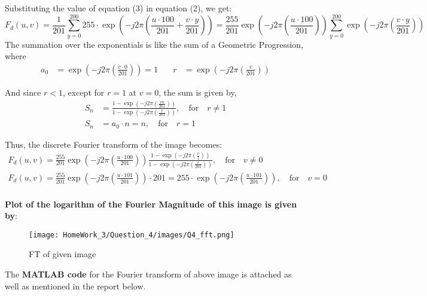 \documentclass{article}
\begin{document}
\begin{enumerate}
Substituting the value of equation (3) in equation (2), we get:
\begin{equation}
    F_d(u, v) = \frac{1}{201} \sum_{y=0}^{200} 255 \cdot \exp \left(- j 2 \pi \left( \frac{u\cdot 100}{201} + \frac{v\cdot y}{201} \right) \right) = \frac{255}{201} \exp \left(- j 2 \pi \left( \frac{u\cdot100}{201}\right) \right) \sum_{y=0}^{200} \exp \left(- j 2 \pi \left( \frac{v\cdot y}{201} \right) \right)
\end{equation}
The summation over the exponentials is like the sum of a Geometric Progression, where 
\begin{equation}
\begin{aligned}
    a_0 &= \exp\left( -j2\pi \left( \frac{v \cdot 0}{201} \right) \right) = 1 \quad & r &= \exp\left( -j2\pi \left( \frac{v}{201} \right) \right)
\end{aligned}
\end{equation}

And since \(r < 1\), except for \(r = 1\) at \(v = 0\), the sum is given by,
\begin{equation}
\begin{aligned}
S_n &= \frac{1 - \exp\left( -j2\pi \left( \frac{vn}{201} \right) \right)}{1 - \exp\left( -j2\pi \left( \frac{v}{201} \right) \right)}, \quad \text{for} \quad r \neq 1 \\
S_n &= a_0 \cdot n = n, \quad \text{for} \quad r = 1
\end{aligned}
\end{equation}

Thus, the discrete Fourier transform of the image becomes:
\begin{equation}
\begin{aligned}
    F_d(u, v) = \frac{255}{201} \exp \left(- j 2 \pi \left( \frac{u\cdot100}{201}\right) \right) \frac{1 - \exp\left( -j2\pi \left( \frac{v}{1} \right) \right)}{1 - \exp\left( -j2\pi \left( \frac{v}{201} \right) \right)}, \quad \text{for} \quad v \neq 0 \\
    F_d(u, v) = \frac{255}{201} \exp \left(- j 2 \pi \left( \frac{u\cdot101}{201}\right) \right) \cdot 201 = 255 \cdot \exp \left(- j 2 \pi \left( \frac{u\cdot101}{201}\right) \right), \quad \text{for} \quad v = 0
\end{aligned}
\end{equation}
\\ 
\textbf{Plot of the logarithm of the Fourier Magnitude of this image is given by}:

\begin{figure}[!h]
    \centering
    \texttt{[image: HomeWork\_3/Question\_4/images/Q4\_fft.png]}
    \caption{FT of given image}
\end{figure}
The \textbf{MATLAB code} for the Fourier transform of above image is attached as well as mentioned in the report below.


\end{enumerate}
\end{document}
